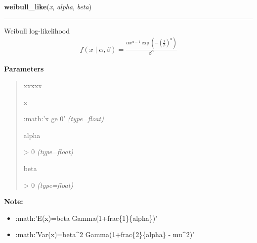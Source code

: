     \begin{boxedminipage}{\textwidth}

    \raggedright \textbf{weibull\_like}(\textit{x}, \textit{alpha}, \textit{beta})

    \vspace{-1.5ex}

    \rule{\textwidth}{0.5\fboxrule}

Weibull log-likelihood
\begin{equation*}\begin{split}f(x \mid \alpha, \beta) = \frac{\alpha x^{\alpha - 1}\exp(-(\frac{x}{\beta})^{\alpha})}{\beta^\alpha}\end{split}\end{equation*}    \vspace{1ex}

      \textbf{Parameters}
      \begin{quote}
        \begin{Ventry}{xxxxx}

          \item[x]


:math:'x ge 0'
            \textit{(type=float)}

          \item[alpha]


{\textgreater} 0
            \textit{(type=float)}

          \item[beta]


{\textgreater} 0
            \textit{(type=float)}

        \end{Ventry}

      \end{quote}

    \vspace{1ex}

\textbf{Note:} \begin{itemize}
\item {} 
:math:'E(x)=beta Gamma(1+frac{\{}1{\}}{\{}alpha{\}})'

\item {} 
:math:'Var(x)=beta{\textasciicircum}2 Gamma(1+frac{\{}2{\}}{\{}alpha{\}} - mu{\textasciicircum}2)'

\end{itemize}


    \end{boxedminipage}

    \label{pymc:distributions:rwishart}

